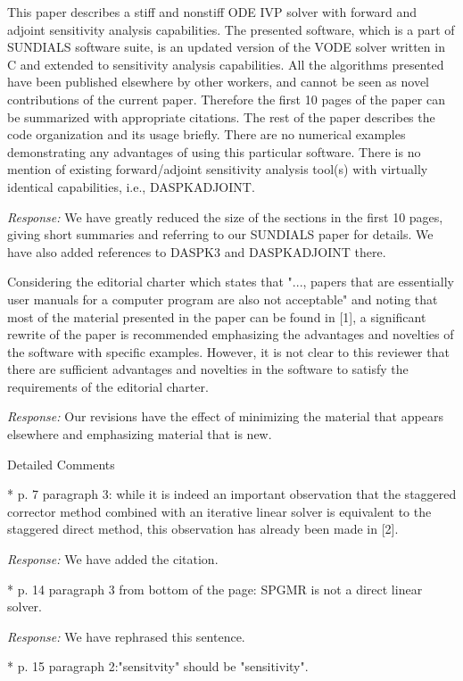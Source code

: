 This paper describes a stiff and nonstiff ODE IVP solver with forward
and adjoint sensitivity analysis capabilities. The presented software,
which is a part of SUNDIALS software suite, is an updated version of
the VODE solver written in C and extended to sensitivity analysis
capabilities.  All the algorithms presented have been published
elsewhere by other workers, and cannot be seen as novel contributions
of the current paper. Therefore the first 10 pages of the paper can be
summarized with appropriate citations. The rest of the paper describes
the code organization and its usage briefly. There are no numerical
examples demonstrating any advantages of using this particular
software. There is no mention of existing forward/adjoint sensitivity
analysis tool(s) with virtually identical capabilities, i.e.,
DASPKADJOINT.

{\em Response:}
We have greatly reduced the size of the sections in the first 10
pages, giving short summaries and referring to our SUNDIALS paper for
details.  We have also added references to DASPK3 and DASPKADJOINT
there.

Considering the editorial charter which states that "..., papers that
are essentially user manuals for a computer program are also not
acceptable" and noting that most of the material presented in the
paper can be found in [1], a significant rewrite of the paper is
recommended emphasizing the advantages and novelties of the software
with specific examples. However, it is not clear to this reviewer that
there are sufficient advantages and novelties in the software to
satisfy the requirements of the editorial charter.

{\em Response:} 
Our revisions have the effect of minimizing the material that appears
elsewhere and emphasizing material that is new.

Detailed Comments

* p. 7 paragraph 3: while it is indeed an important observation that
the staggered corrector method combined with an iterative linear
solver is equivalent to the staggered direct method, this observation
has already been made in [2].

{\em Response:}
We have added the citation.

* p. 14 paragraph 3 from bottom of the page: SPGMR is not a direct
linear solver.

{\em Response:}
We have rephrased this sentence.

* p. 15 paragraph 2:"sensitvity" should be "sensitivity".

